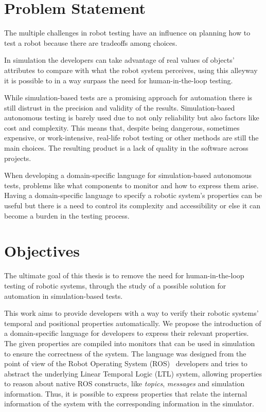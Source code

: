 \section{Problem Statement}
\label{sec:problem}

The multiple challenges in robot testing have an influence on planning how to test a robot because there are tradeoffs among choices.

In simulation the developers can take advantage of real values of objects' attributes to compare with what the robot system perceives, using this alleyway it is possible to in a way surpass the need for human-in-the-loop testing. 
 
While simulation-based tests are a promising approach for automation there is still distrust in the precision and validity of the results. Simulation-based autonomous testing is barely used due to not only reliability but also factors like cost and complexity. This means that, despite being dangerous, sometimes expensive, or work-intensive, real-life robot testing or other methods are still the main choices. The resulting product is a lack of quality in the software across projects.

When developing a domain-specific language for simulation-based autonomous tests, problems like what components to monitor and how to express them arise. Having a domain-specific language to specify a robotic system's properties can be useful but there is a need to control its complexity and accessibility or else it can become a burden in the testing process.


\section{Objectives}
\label{sec:objectives}

The ultimate goal of this thesis is to remove the need for human-in-the-loop testing of robotic systems, through the study of a possible solution for automation in simulation-based tests.

This work aims to provide developers with a way to verify their robotic systems' temporal and positional properties automatically. We propose the introduction of a domain-specific language for developers to express their relevant properties. The given properties are compiled into monitors that can be used in simulation to ensure the correctness of the system. The language was designed from the point of view of the Robot Operating System (ROS)~\cite{quigley2009ros} developers and tries to abstract the underlying Linear Temporal Logic (LTL) system, allowing properties to reason about native ROS constructs, like \textit{topics}, \textit{messages} and simulation information. Thus, it is possible to express properties that relate the internal information of the system with the corresponding information in the simulator.

